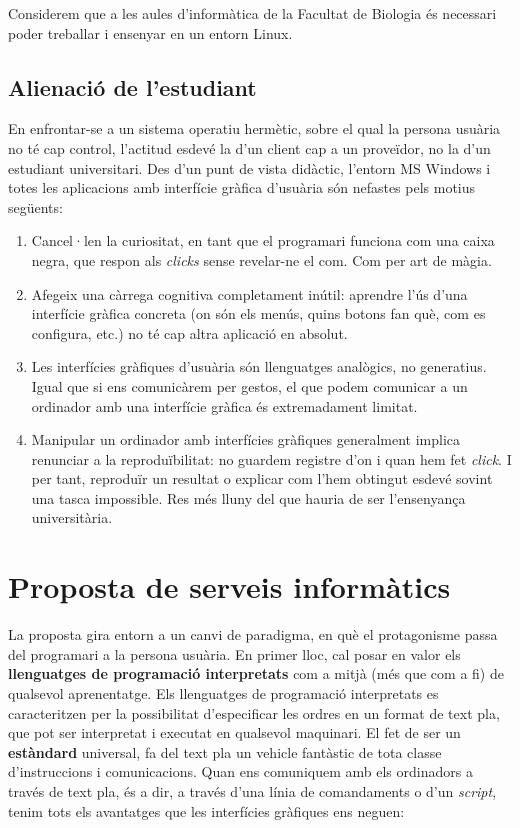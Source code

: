 \documentclass[a4paper,12pt]{article}
\begin{document}
Considerem que a les aules d'informàtica de la Facultat de Biologia és necessari poder
treballar i ensenyar en un entorn Linux.

\subsection{Alienació de l'estudiant}
En enfrontar-se a un sistema operatiu hermètic, sobre el qual la persona usuària no té
cap control, l'actitud esdevé la d'un client cap a un proveïdor, no la d'un estudiant
universitari. Des d'un punt de vista didàctic, l'entorn MS Windows i totes les aplicacions
amb interfície gràfica d'usuària són nefastes pels motius següents:

\begin{enumerate}
\item Cancel·len la curiositat, en tant que el programari funciona com una caixa negra,
que respon als \emph{clicks} sense revelar-ne el com. Com per art de màgia.
\item Afegeix una càrrega cognitiva completament inútil: aprendre l'ús d'una interfície
gràfica concreta (on són els menús, quins botons fan què, com es configura, etc.) no té
cap altra aplicació en absolut.
\item Les interfícies gràfiques d'usuària són llenguatges analògics, no generatius. Igual
que si ens comunicàrem per gestos, el que podem comunicar a un ordinador amb una interfície
gràfica és extremadament limitat.
\item Manipular un ordinador amb interfícies gràfiques generalment implica renunciar a
la reproduïbilitat: no guardem registre d'on i quan hem fet \emph{click}. I per tant,
reproduïr un resultat o explicar com l'hem obtingut esdevé sovint una tasca impossible.
Res més lluny del que hauria de ser l'ensenyança universitària.
\end{enumerate}

\section{Proposta de serveis informàtics}
La proposta gira entorn a un canvi de paradigma, en què el protagonisme passa del
programari a la persona usuària. En primer lloc, cal posar en valor els \textbf{llenguatges
de programació interpretats} com a mitjà (més que com a fi) de qualsevol aprenentatge. Els
llenguatges de programació interpretats es caracteritzen
per la possibilitat d'especificar les ordres en un format de text pla, que pot ser
interpretat i executat en qualsevol maquinari. El fet de ser un \textbf{estàndard}
universal, fa del text pla un vehicle fantàstic de tota classe d'instruccions i comunicacions.
Quan ens comuniquem amb els ordinadors a través de text pla, és a dir, a través d'una línia
de comandaments o d'un \emph{script}, tenim tots els avantatges que les interfícies gràfiques
ens neguen:
\end{document}
